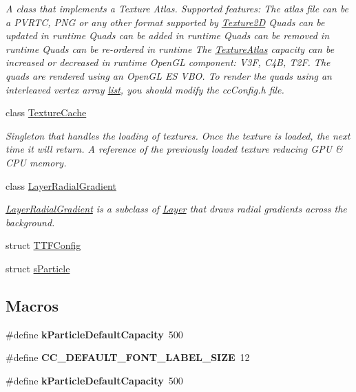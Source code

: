 \begin{DoxyCompactItemize}
\begin{DoxyCompactList}\small\item\em A class that implements a Texture Atlas. Supported features\+: The atlas file can be a P\+V\+R\+TC, P\+NG or any other format supported by \hyperlink{classTexture2D}{Texture2D} Quads can be updated in runtime Quads can be added in runtime Quads can be removed in runtime Quads can be re-\/ordered in runtime The \hyperlink{classTextureAtlas}{Texture\+Atlas} capacity can be increased or decreased in runtime Open\+GL component\+: V3F, C4B, T2F. The quads are rendered using an Open\+GL ES V\+BO. To render the quads using an interleaved vertex array \hyperlink{protocollist-p}{list}, you should modify the cc\+Config.\+h file. \end{DoxyCompactList}\item 
class \hyperlink{classTextureCache}{Texture\+Cache}
\begin{DoxyCompactList}\small\item\em Singleton that handles the loading of textures. Once the texture is loaded, the next time it will return. A reference of the previously loaded texture reducing G\+PU \& C\+PU memory. \end{DoxyCompactList}\item 
class \hyperlink{classLayerRadialGradient}{Layer\+Radial\+Gradient}
\begin{DoxyCompactList}\small\item\em \hyperlink{classLayerRadialGradient}{Layer\+Radial\+Gradient} is a subclass of \hyperlink{classLayer}{Layer} that draws radial gradients across the background. \end{DoxyCompactList}\item 
struct \hyperlink{structTTFConfig}{T\+T\+F\+Config}
\item 
struct \hyperlink{structsParticle}{s\+Particle}
\end{DoxyCompactItemize}
\subsection*{Macros}
\begin{DoxyCompactItemize}
\item 
\mbox{\label{group____2d_gac8774050a26654549400b29576e19391}} 
\#define {\bfseries k\+Particle\+Default\+Capacity}~500
\item 
\mbox{\label{group____2d_ga047b2fa743906fe7cfea6c3ac3f12725}} 
\#define {\bfseries C\+C\+\_\+\+D\+E\+F\+A\+U\+L\+T\+\_\+\+F\+O\+N\+T\+\_\+\+L\+A\+B\+E\+L\+\_\+\+S\+I\+ZE}~12
\item 
\mbox{\label{group____2d_gac8774050a26654549400b29576e19391}} 
\#define {\bfseries k\+Particle\+Default\+Capacity}~500
\end{DoxyCompactItemize}

